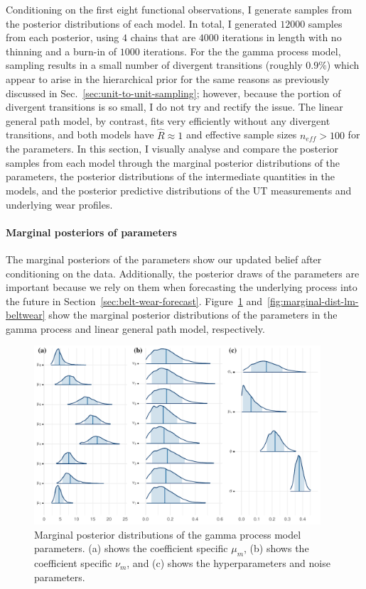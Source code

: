 Conditioning on the first eight functional observations, I generate samples from the posterior distributions of each model. In total, I generated $12000$ samples from each posterior, using $4$ chains that are $4000$ iterations in length with no thinning and a burn-in of $1000$ iterations. For the the gamma process model, sampling results in a small number of divergent transitions (roughly $0.9\%$) which appear to arise in the hierarchical prior for the same reasons as previously discussed in Sec.~\ref{sec:unit-to-unit-sampling}; however, because the portion of divergent transitions is so small, I do not try and rectify the issue. The linear general path model, by contrast, fits very efficiently without any divergent transitions, and both models have $\hat{R} \approx 1$ and effective sample sizes $n_{eff} > 100$ for the parameters. In this section, I visually analyse and compare the posterior samples from each model through the marginal posterior distributions of the parameters, the posterior distributions of the intermediate quantities in the models, and the posterior predictive distributions of the UT measurements and underlying wear profiles.

\paragraph{Marginal posteriors of parameters} 
The marginal posteriors of the parameters show our updated belief after conditioning on the data. Additionally, the posterior draws of the parameters are important because we rely on them when forecasting the underlying process into the future in Section~\ref{sec:belt-wear-forecast}. Figure~\ref{fig:marginal-dist-gp-beltwear} and~\ref{fig:marginal-dist-lm-beltwear} show the marginal posterior distributions of the parameters in the gamma process and linear general path model, respectively.

\begin{figure}[tbp]
  \centering
  \includegraphics[width=0.95\textwidth]{figures/ch-6/marginal_post_gp.pdf}
  \caption{Marginal posterior distributions of the gamma process model parameters. (a) shows the coefficient specific $\mu_m$, (b) shows the coefficient specific $\nu_m$, and (c) shows the hyperparameters and noise parameters.}
  \label{fig:marginal-dist-gp-beltwear}
\end{figure}

